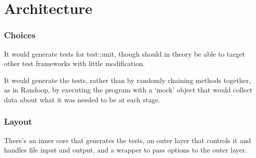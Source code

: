\chapter{Architecture}
  \subsection{Choices}
    It would generate tests for test::unit, though should in theory be able to target other test frameworks with little modification.

    It would generate the tests, rather than by randomly chaining methods together, as in Randoop, by executing the program with a `mock' object that would collect data about what it was needed to be at each stage.

  \subsection{Layout}
    There's an inner core that generates the tests, an outer layer that controls it and handles file input and output, and a wrapper to pass options to the outer layer.

